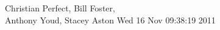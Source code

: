 \documentclass[12pt]{report}
\begin{document}
              {Christian Perfect, Bill Foster,\\Anthony Youd, Stacey Aston}
              {\small{Wed 16 Nov 09:38:19 2011}}


  


  \tableofcontents

  \clearpage


  
  
  
  
  
  
  
  
  
  

  \appendix

  

\end{document}
